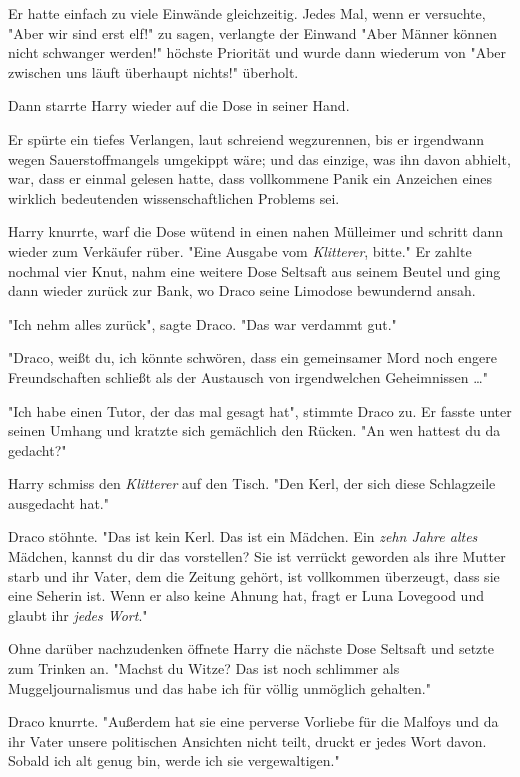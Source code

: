 {Er hatte einfach zu viele Einwände gleichzeitig. Jedes Mal, wenn er versuchte, "Aber wir sind erst elf!" zu sagen, verlangte der Einwand "Aber Männer können nicht schwanger werden!" höchste Priorität und wurde dann wiederum von "Aber zwischen uns läuft überhaupt nichts!" überholt.

Dann starrte Harry wieder auf die Dose in seiner Hand.

Er spürte ein tiefes Verlangen, laut schreiend wegzurennen, bis er irgendwann wegen Sauerstoffmangels umgekippt wäre; und das einzige, was ihn davon abhielt, war, dass er einmal gelesen hatte, dass vollkommene Panik ein Anzeichen eines wirklich bedeutenden wissenschaftlichen Problems sei.

Harry knurrte, warf die Dose wütend in einen nahen Mülleimer und schritt dann wieder zum Verkäufer rüber. "Eine Ausgabe vom \emph{Klitterer}, bitte." Er zahlte nochmal vier Knut, nahm eine weitere Dose Seltsaft aus seinem Beutel und ging dann wieder zurück zur Bank, wo Draco seine Limodose bewundernd ansah.

"Ich nehm alles zurück", sagte Draco. "Das war verdammt gut."

"Draco, weißt du, ich könnte schwören, dass ein gemeinsamer Mord noch engere Freundschaften schließt als der Austausch von irgendwelchen Geheimnissen …"

"Ich habe einen Tutor, der das mal gesagt hat", stimmte Draco zu. Er fasste unter seinen Umhang und kratzte sich gemächlich den Rücken. "An wen hattest du da gedacht?"

Harry schmiss den \emph{Klitterer} auf den Tisch. "Den Kerl, der sich diese Schlagzeile ausgedacht hat."

Draco stöhnte. "Das ist kein Kerl. Das ist ein Mädchen. Ein \emph{zehn Jahre altes} Mädchen, kannst du dir das vorstellen? Sie ist verrückt geworden als ihre Mutter starb und ihr Vater, dem die Zeitung gehört, ist vollkommen überzeugt, dass sie eine Seherin ist. Wenn er also keine Ahnung hat, fragt er Luna Lovegood und glaubt ihr \emph{jedes Wort}."

Ohne darüber nachzudenken öffnete Harry die nächste Dose Seltsaft und setzte zum Trinken an. "Machst du Witze? Das ist noch schlimmer als Muggeljournalismus und das habe ich für völlig unmöglich gehalten."

Draco knurrte. "Außerdem hat sie eine perverse Vorliebe für die Malfoys und da ihr Vater unsere politischen Ansichten nicht teilt, druckt er jedes Wort davon. Sobald ich alt genug bin, werde ich sie vergewaltigen."

}
